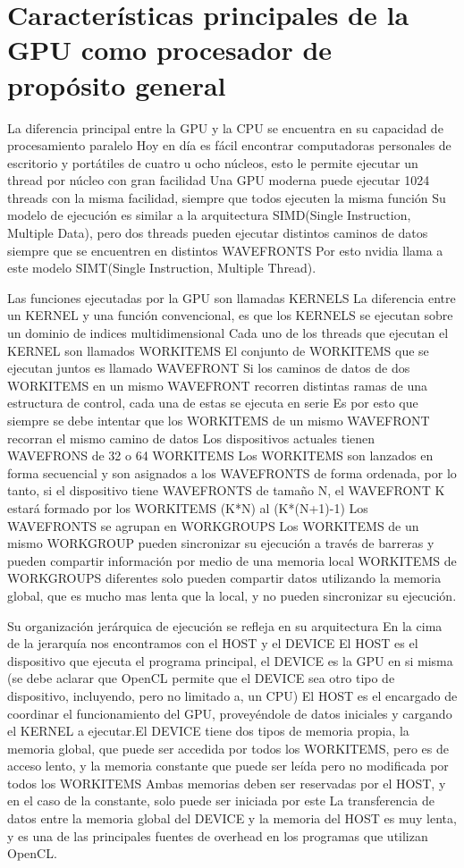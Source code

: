 
\chapter{Características principales de la GPU como procesador de propósito
general}

La diferencia principal entre la GPU y la CPU se encuentra en su capacidad de
procesamiento paralelo Hoy en día es fácil encontrar computadoras personales de
escritorio y portátiles de cuatro u ocho núcleos, esto le permite ejecutar un
thread por núcleo con gran facilidad Una GPU moderna puede ejecutar 1024 threads
con la misma facilidad, siempre que todos ejecuten la misma función Su modelo de
ejecución es similar a la arquitectura SIMD(Single Instruction, Multiple Data),
pero dos threads pueden ejecutar distintos caminos de datos siempre que se
encuentren en distintos WAVEFRONTS Por esto nvidia llama a este modelo
SIMT(Single Instruction, Multiple Thread).

Las funciones ejecutadas por la GPU son llamadas KERNELS La diferencia entre un
KERNEL y una función convencional, es que los KERNELS se ejecutan sobre un
dominio de indices multidimensional Cada uno de los threads que ejecutan el
KERNEL son llamados WORKITEMS El conjunto de WORKITEMS que se ejecutan juntos es
llamado WAVEFRONT Si los caminos de datos de dos WORKITEMS en un mismo WAVEFRONT
recorren distintas ramas de una estructura de control, cada una de estas se
ejecuta en serie Es por esto que siempre se debe intentar que los WORKITEMS de
un mismo WAVEFRONT recorran el mismo camino de datos Los dispositivos actuales
tienen WAVEFRONS de 32 o 64 WORKITEMS Los WORKITEMS son lanzados en forma
secuencial y son asignados a los WAVEFRONTS de forma ordenada, por lo tanto, si
el dispositivo tiene WAVEFRONTS de tamaño N, el WAVEFRONT K estará formado por
los WORKITEMS (K*N) al (K*(N+1)-1) Los WAVEFRONTS se agrupan en WORKGROUPS Los
WORKITEMS de un mismo WORKGROUP pueden sincronizar su ejecución a través de
barreras y pueden compartir información por medio de una memoria local WORKITEMS
de WORKGROUPS diferentes solo pueden compartir datos utilizando la memoria
global, que es mucho mas lenta que la local, y no pueden sincronizar su
ejecución.

Su organización jerárquica de ejecución se refleja en su arquitectura En la cima
de la jerarquía nos encontramos con el HOST y el DEVICE El HOST es el
dispositivo que ejecuta el programa principal, el DEVICE es la GPU en si misma
(se debe aclarar que OpenCL permite que el DEVICE sea otro tipo de dispositivo,
incluyendo, pero no limitado a, un CPU) El HOST es el encargado de coordinar el
funcionamiento del GPU, proveyéndole de datos iniciales y cargando el KERNEL a
ejecutar.El DEVICE tiene dos tipos de memoria propia, la memoria global, que
puede ser accedida por todos los WORKITEMS, pero es de acceso lento, y la
memoria constante que puede ser leída pero no modificada por todos los WORKITEMS
Ambas memorias deben ser reservadas por el HOST, y en el caso de la constante,
solo puede ser iniciada por este La transferencia de datos entre la memoria
global del DEVICE y la memoria del HOST es muy lenta, y es una de las
principales fuentes de overhead en los programas que utilizan OpenCL.

